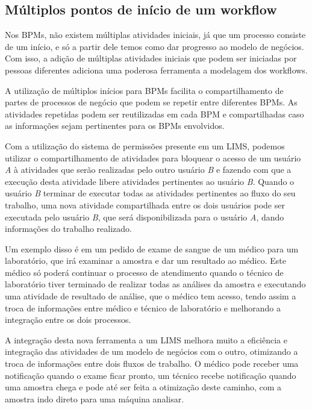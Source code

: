 \subsection{Múltiplos pontos de início de um workflow}




Nos BPMs, não existem múltiplas atividades iniciais, já que um processo consiste de um início, e só a partir dele temos como dar progresso ao modelo de negócios. Com isso, a adição de múltiplas atividades iniciais que podem ser iniciadas por pessoas diferentes adiciona uma poderosa ferramenta a modelagem dos workflows.


A utilização de múltiplos inícios para BPMs facilita o compartilhamento de partes de processos de negócio que podem se repetir entre diferentes BPMs. As atividades repetidas podem ser reutilizadas em cada BPM e compartilhadas caso as informações sejam pertinentes para os BPMs envolvidos.

Com a utilização do sistema de permissões presente em um LIMS, podemos utilizar o compartilhamento de atividades para bloquear o acesso de um usuário \textit{A} à atividades que serão realizadas pelo outro usuário \textit{B} e fazendo com que a execução desta atividade libere atividades pertinentes ao usuário \textit{B}. Quando o usuário \textit{B} terminar de executar todas as atividades pertinentes ao fluxo do seu trabalho, uma nova atividade compartilhada entre os dois usuários pode ser executada pelo usuário \textit{B}, que será disponibilizada para o usuário \textit{A}, dando informações do trabalho realizado.

Um exemplo disso é em um pedido de exame de sangue de um médico para um laboratório, que irá examinar a amostra e dar um resultado ao médico. Este médico só poderá continuar o processo de atendimento quando o técnico de laboratório tiver terminado de realizar todas as análises da amostra e executando uma atividade de resultado de análise, que o médico tem acesso, tendo assim a troca de informações entre médico e técnico de laboratório e melhorando a integração entre os dois processos.


A integração desta nova ferramenta a um LIMS melhora muito a eficiência e integração das atividades de um modelo de negócios com o outro, otimizando a troca de informações entre dois fluxos de trabalho. O médico pode receber uma notificação quando o exame ficar pronto, um técnico recebe notificação quando uma amostra chega e pode até ser feita a otimização deste caminho, com a amostra indo direto para uma máquina analisar.

